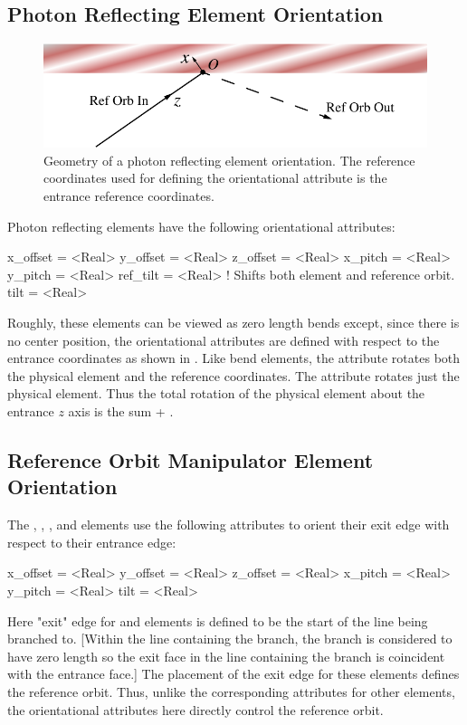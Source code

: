 \subsection{Photon Reflecting Element Orientation}

\begin{figure}[ht]
  \centering
  \includegraphics{reflect-orient.pdf}
  \caption[Geometry of a photon reflecting element orientation]{
Geometry of a photon reflecting element orientation.
The reference coordinates used for defining the orientational attribute
is the entrance reference coordinates. 
}
  \label{f:reflect.orient}
\end{figure}

Photon reflecting elements have the following orientational attributes:
\begin{example}
  x_offset = <Real>
  y_offset = <Real>
  z_offset = <Real>
  x_pitch  = <Real>
  y_pitch  = <Real>
  ref_tilt = <Real>    ! Shifts both element and reference orbit.
  tilt     = <Real>    
\end{example}
Roughly, these elements can be viewed as zero length bends except,
since there is no center position, the orientational attributes are
defined with respect to the entrance coordinates as shown in
. Like bend elements, the  attribute
rotates both the physical element and the reference coordinates.
The  attribute rotates just the physical element. Thus
the total rotation of the physical element about the entrance $z$
axis is the sum  + .

\subsection{Reference Orbit Manipulator Element Orientation}

The , , , and  elements
use the following attributes to orient their exit edge with respect to their
entrance edge:
\begin{example}
  x_offset = <Real>
  y_offset = <Real>
  z_offset = <Real>
  x_pitch  = <Real>
  y_pitch  = <Real>
  tilt     = <Real>    
\end{example}
Here "exit" edge for  and  elements is defined
to be the start of the line being branched to. [Within the line containing
the branch, the branch is considered to have zero length so the exit face
in the line containing the branch is coincident with the entrance face.]
The placement of the exit edge for these elements defines the reference orbit.
Thus, unlike the corresponding attributes for other elements, 
the orientational attributes here directly control the reference orbit.

